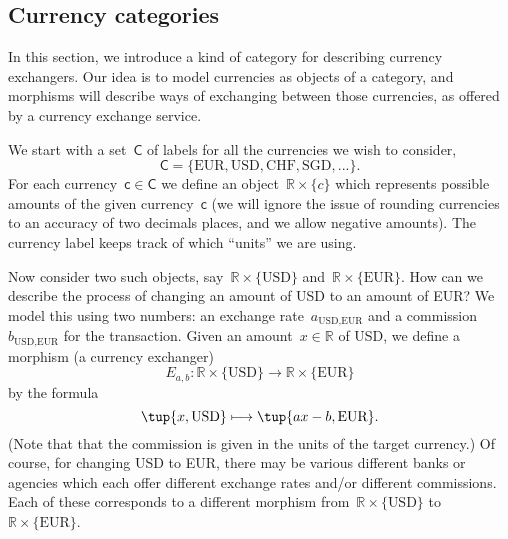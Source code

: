 \subsection{Currency categories}
In this section, we introduce a kind of category for describing currency exchangers. Our idea is to model currencies as objects of a category, and morphisms will describe ways of exchanging between those currencies,  as offered by a currency exchange service. 

We start with a set~$\mathsf{C}$ of labels for all the currencies we wish to consider,  
\begin{equation*}
    \mathsf{C} = \{ \text{EUR}, \text{USD}, \text{CHF}, \text{SGD}, ... \}.
\end{equation*}
For each currency~$\mathsf{c} \in \mathsf{C}$ we define an object~$\mathbb{R} \times \{c\}$ which represents possible amounts of the given currency~$\mathsf{c}$ (we will ignore the issue of rounding currencies to an accuracy of two decimals places, and we allow negative amounts). The currency label keeps track of which ``units'' we are using.

Now consider two such objects, say~$\mathbb{R} \times \{\text{USD}\}$ and~$\mathbb{R} \times \{\text{EUR}\}$. How can we describe the process of changing an amount of USD to an amount of EUR? We model this using two numbers: an exchange rate~$a_{\text{USD}, \text{EUR}}$ and a commission~$b_{\text{USD}, \text{EUR}}$ for the transaction. Given an amount~$x \in \mathbb{R}$ of USD, we define a morphism (a currency exchanger)
\begin{equation*}
E_{a,b} \colon \mathbb{R} \times \{\text{USD}\} \rightarrow \mathbb{R} \times \{\text{EUR}\}
\end{equation*}
by the formula
\begin{equation*}
\tup{x, \text{USD}} \longmapsto \tup{ax - b, \text{EUR}}. 
\end{equation*}
(Note that that the commission is given in the units of the target currency.) Of course, for changing USD to EUR, there may be various different banks or agencies which each offer different exchange rates and/or different commissions. Each of these corresponds to a different morphism from~$\mathbb{R} \times \{\text{USD}\}$ to~$\mathbb{R} \times \{\text{EUR}\}$.

